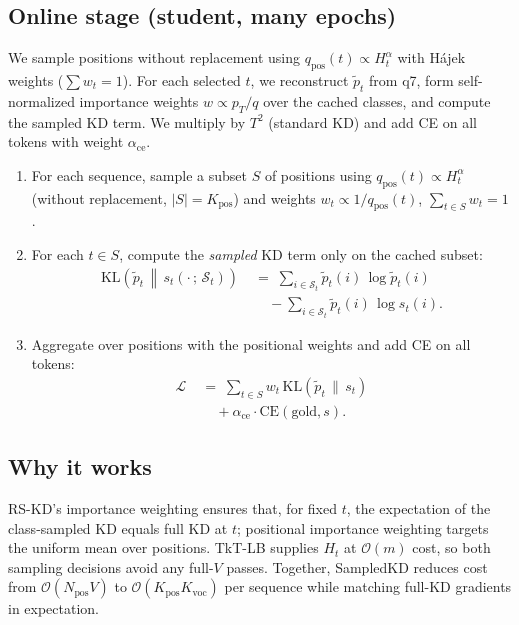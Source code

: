 \documentclass[11pt]{article}
\begin{document}
\subsection{Online stage (student, many epochs)}
We sample positions without replacement using $q_{\text{pos}}(t)\propto H_t^\alpha$ with Hájek weights ($\sum w_t=1$).
For each selected $t$, we reconstruct $\tilde p_t$ from q7, form self-normalized importance weights $w \propto p_T/q$ over the cached classes, and compute the sampled KD term. We multiply by $T^2$ (standard KD) and add CE on all tokens with weight $\alpha_{\text{ce}}$.
\begin{enumerate}
	\item For each sequence, sample a subset $S$ of positions using $q_{\text{pos}}(t)\!\propto\!H_t^\alpha$ (without replacement, $|S|{=}K_{\text{pos}}$) and weights $w_t \propto 1/q_{\text{pos}}(t)$, $\sum_{t\in S}w_t{=}1$.
	\item For each $t \in S$, compute the \emph{sampled} KD term only on the cached subset:
	      \begin{align*}
		      \mathrm{KL}\!\left(\tilde p_t \,\middle\|\, s_t(\cdot\,;\,\mathcal{S}_t)\right)
		      \; & =\; \sum_{i \in \mathcal{S}_t} \tilde p_t(i)\,\log \tilde p_t(i) \\
		         & \quad - \sum_{i \in \mathcal{S}_t} \tilde p_t(i)\,\log s_t(i).
	      \end{align*}
	\item Aggregate over positions with the positional weights and add CE on all tokens:
	      \begin{align*}
		      \mathcal{L} \; & =\; \sum_{t\in S} w_t\, \mathrm{KL}\!\left(\tilde p_t \,\|\, s_t\right) \\
		                     & \quad + \alpha_{\text{ce}} \cdot \text{CE}(\text{gold}, s).
	      \end{align*}
\end{enumerate}

\subsection{Why it works}
RS-KD's importance weighting ensures that, for fixed $t$, the expectation of the class-sampled KD equals full KD at $t$; positional importance weighting targets the uniform mean over positions.
TkT-LB supplies $H_t$ at $\mathcal{O}(m)$ cost, so both sampling decisions avoid any full-$V$ passes.
Together, SampledKD reduces cost from $\mathcal{O}(N_{\text{pos}}V)$ to $\mathcal{O}(K_{\text{pos}}K_{\text{voc}})$ per sequence while matching full-KD gradients in expectation.
\end{document}
